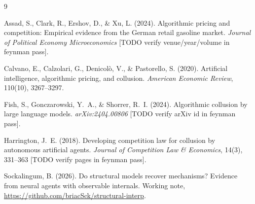 \documentclass[11pt]{article}
\begin{document}
\begin{thebibliography}{9}\small

Assad, S., Clark, R., Ershov, D., \& Xu, L. (2024). Algorithmic pricing
and competition: Empirical evidence from the German retail gasoline
market. \emph{Journal of Political Economy Microeconomics} [TODO verify
venue/year/volume in feynman pass].

Calvano, E., Calzolari, G., Denicol\`o, V., \& Pastorello, S. (2020).
Artificial intelligence, algorithmic pricing, and collusion.
\emph{American Economic Review}, 110(10), 3267--3297.

Fish, S., Gonczarowski, Y.~A., \& Shorrer, R.~I. (2024). Algorithmic
collusion by large language models. \emph{arXiv:2404.00806} [TODO verify
arXiv id in feynman pass].

Harrington, J.~E. (2018). Developing competition law for collusion by
autonomous artificial agents. \emph{Journal of Competition Law \&
Economics}, 14(3), 331--363 [TODO verify pages in feynman pass].

Sockalingum, B. (2026). Do structural models recover mechanisms? Evidence
from neural agents with observable internals. Working note,
\url{https://github.com/briacSck/structural-interp}.

\end{thebibliography}

\end{document}
